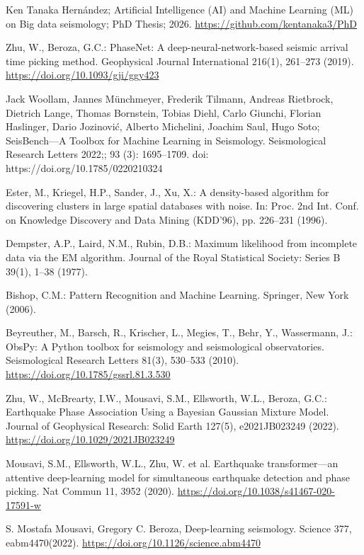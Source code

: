 \documentclass{llncs}
\begin{document}
\begin{thebibliography}{9}
Ken Tanaka Hernández; Artificial Intelligence (AI) and Machine Learning (ML) on Big data seismology; PhD Thesis; 2026. \url{https://github.com/kentanaka3/PhD}

Zhu, W., Beroza, G.C.: PhaseNet: A deep-neural-network-based seismic arrival time picking method. Geophysical Journal International 216(1), 261--273 (2019). \url{https://doi.org/10.1093/gji/ggy423}

Jack Woollam, Jannes Münchmeyer, Frederik Tilmann, Andreas Rietbrock, Dietrich Lange, Thomas Bornstein, Tobias Diehl, Carlo Giunchi, Florian Haslinger, Dario Jozinović, Alberto Michelini, Joachim Saul, Hugo Soto; SeisBench—A Toolbox for Machine Learning in Seismology. Seismological Research Letters 2022;; 93 (3): 1695–1709. doi: https://doi.org/10.1785/0220210324

Ester, M., Kriegel, H.P., Sander, J., Xu, X.:
A density-based algorithm for discovering clusters in large spatial databases with noise.
In: Proc. 2nd Int. Conf. on Knowledge Discovery and Data Mining (KDD'96), pp. 226--231 (1996).

Dempster, A.P., Laird, N.M., Rubin, D.B.:
Maximum likelihood from incomplete data via the EM algorithm.
Journal of the Royal Statistical Society: Series B 39(1), 1--38 (1977).

Bishop, C.M.:
Pattern Recognition and Machine Learning.
Springer, New York (2006).

Beyreuther, M., Barsch, R., Krischer, L., Megies, T., Behr, Y., Wassermann, J.:
ObsPy: A Python toolbox for seismology and seismological observatories.
Seismological Research Letters 81(3), 530--533 (2010).
\url{https://doi.org/10.1785/gssrl.81.3.530}

Zhu, W., McBrearty, I.W., Mousavi, S.M., Ellsworth, W.L., Beroza, G.C.:
Earthquake Phase Association Using a Bayesian Gaussian Mixture Model.
Journal of Geophysical Research: Solid Earth 127(5), e2021JB023249 (2022).
\url{https://doi.org/10.1029/2021JB023249}

Mousavi, S.M., Ellsworth, W.L., Zhu, W. et al. Earthquake transformer—an 
attentive deep-learning model for simultaneous earthquake detection and phase 
picking. Nat Commun 11, 3952 (2020).
\url{https://doi.org/10.1038/s41467-020-17591-w}

S. Mostafa Mousavi, Gregory C. Beroza, Deep-learning seismology. Science 377, 
eabm4470(2022). \url{https://doi.org/10.1126/science.abm4470}


\end{thebibliography}
\end{document}
